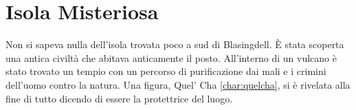 \section{Isola Misteriosa}
Non si sapeva nulla dell'isola trovata poco a sud di Blasingdell.
\`E stata scoperta una antica civilt\`a che abitava anticamente il posto.
All'interno di un vulcano \`e stato trovato un tempio con un percorso di
purificazione dai mali e i crimini dell'uomo contro la natura. Una figura, Quel' Cha \ref{char:quelcha}, si \`e
rivelata alla fine di tutto dicendo di essere la protettrice del luogo.



